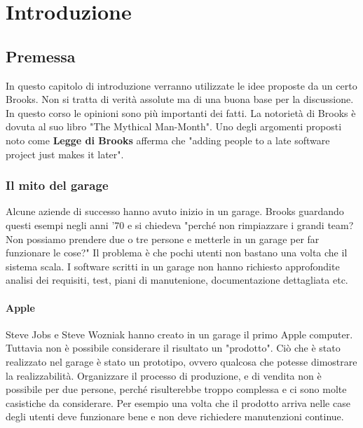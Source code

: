 \section{Introduzione}
\subsection{Premessa}
In questo capitolo di introduzione verranno utilizzate le idee proposte da un certo Brooks. Non si tratta di verità assolute ma di una buona base per la discussione. In questo corso le opinioni sono più importanti dei fatti.\newline
La notorietà di Brooks è dovuta al suo libro "The Mythical Man-Month". Uno degli argomenti proposti noto come \textbf{Legge di Brooks} afferma che "adding people to a late software project just makes it later".
\subsubsection{Il mito del garage}
Alcune aziende di successo hanno avuto inizio in un garage.\newline
Brooks guardando questi esempi negli anni '70 e si chiedeva "perché non rimpiazzare i grandi team? Non possiamo prendere due o tre persone e metterle in un garage per far funzionare le cose?"\newline
Il problema è che pochi utenti non bastano una volta che il sistema scala. I software scritti in un garage non hanno richiesto approfondite analisi dei requisiti, test, piani di manutenione, documentazione dettagliata etc.\newline
\paragraph{Apple}
Steve Jobs e Steve Wozniak hanno creato in un garage il primo Apple computer. Tuttavia non è possibile considerare il risultato un "prodotto". Ciò che è stato realizzato nel garage è stato un prototipo, ovvero qualcosa che potesse dimostrare la realizzabilità. Organizzare il processo di produzione, e di vendita non è possibile per due persone, perché risulterebbe troppo complessa e ci sono molte casistiche da considerare.\newline
Per esempio una volta che il prodotto arriva nelle case degli utenti deve funzionare bene e non deve richiedere manutenzioni continue.
